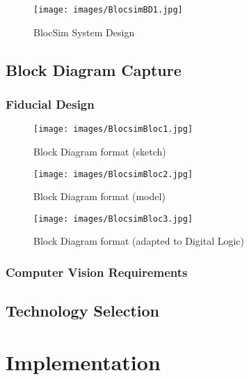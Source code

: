 \begin{figure}[ht!]
\centering
\texttt{[image: images/BlocsimBD1.jpg]}
\caption{BlocSim System Design}
\label{im:BlocsimBD1}
\end{figure}



\section{Block Diagram Capture}



\subsection{Fiducial Design}

\begin{figure}[ht!]
\centering
\texttt{[image: images/BlocsimBloc1.jpg]}
\caption{Block Diagram format (sketch)}
\label{im:BlocsimBD1}
\end{figure}

\begin{figure}[ht!]
\centering
\texttt{[image: images/BlocsimBloc2.jpg]}
\caption{Block Diagram format (model)}
\label{im:BlocsimBD2}
\end{figure}

\begin{figure}[ht!]
\centering
\texttt{[image: images/BlocsimBloc3.jpg]}
\caption{Block Diagram format (adapted to Digital Logic)}
\label{im:BlocsimBD3}
\end{figure}



\subsection{Computer Vision Requirements}



\section{Technology Selection}




\chapter{Implementation}

